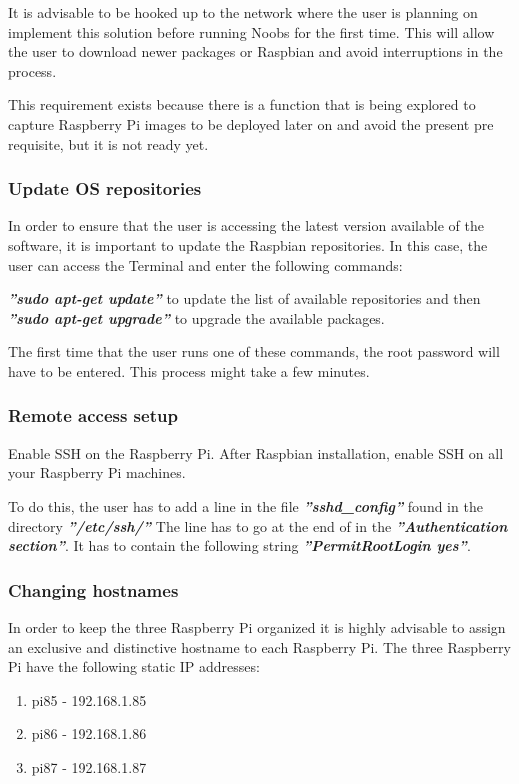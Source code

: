 \documentclass[sigconf]{acmart}
\begin{document}
	It is advisable to be hooked up to the network where the user is planning on implement this solution before running Noobs for the first time. This will allow the user to download newer packages or Raspbian and avoid interruptions in the process.	
		
	This requirement exists because there is a function that is being explored to capture Raspberry Pi images to be deployed later on and avoid the present pre requisite, but it is not ready yet.
	
	\subsubsection{Update OS repositories}
	In order to ensure that the user is accessing the latest version available of the software, it is important to update the Raspbian repositories. 
	In this case, the user can access the Terminal and enter the following commands:
	
		\textbf{\textit{''sudo apt-get update''}} to update the list of available repositories
	and then 	\textbf{\textit{''sudo apt-get upgrade''}} to upgrade the available packages.
	
	The first time that the user runs one of these commands, the root password will have to be entered.
	This process might take a few minutes. \cite{debianpackage}
	
	\subsubsection{Remote access setup}
	Enable SSH on the Raspberry Pi.
	After Raspbian installation, enable SSH on all your Raspberry Pi machines. 
	
	To do this, the user has to add a line in the file \textbf{\textit{''sshd\_config''}} found in the directory \textbf{\textit{''/etc/ssh/''}} 
	The line has to go at the end of in the \textbf{\textit{''Authentication section''}}. 
	It has to contain the following string \textbf{\textit{''PermitRootLogin yes''}}.
	\cite{rootSsh}
	
	\subsubsection{Changing hostnames}
	In order to keep the three Raspberry Pi organized it is highly advisable to assign an exclusive and distinctive hostname to each Raspberry Pi.
The three Raspberry Pi have the following static IP addresses:

\begin{enumerate}
	\item pi85 -  192.168.1.85
	\item pi86 -  192.168.1.86
	\item pi87 -  192.168.1.87
\end{enumerate}
\end{document}
